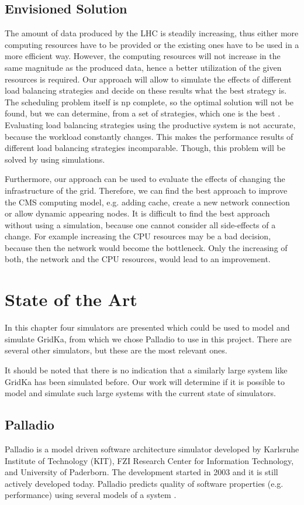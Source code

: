 \section{Envisioned Solution} 
The amount of data produced by the LHC is steadily increasing, thus either more computing resources have to be provided or the existing ones have to be used in a more efficient way.
However, the computing resources will not increase in the same magnitude as the produced data, hence a better utilization of the given resources is required. Our approach will allow to simulate the effects of different load balancing strategies and decide on these results what the best strategy is. The scheduling problem itself is np complete, so the optimal solution will not be found, but we can determine, from a set of strategies, which one is the best \cite{1698650}. Evaluating load balancing strategies using the productive system is not accurate, because the workload constantly changes. This makes the performance results of different load balancing strategies incomparable. Though, this problem will be solved by using simulations.

Furthermore, our approach can be used to evaluate the effects of changing the infrastructure of the grid. Therefore, we can find the best approach to improve the CMS computing model, e.g. adding cache, create a new network connection or allow dynamic appearing nodes.
It is difficult to find the best approach without using a simulation, because one cannot consider all side-effects of a change. For example increasing the CPU resources may be a bad decision, because then the network would become the bottleneck. Only the increasing of both, the network and the CPU resources, would lead to an improvement.


\chapter {State of the Art}
In this chapter four simulators are presented which could be used to model and simulate GridKa, from which we chose Palladio to use in this project. There are several other simulators, but these are the most relevant ones.

It should be noted that there is no indication that a similarly large system like GridKa has been simulated before. Our work will determine if it is possible to model and simulate such large systems with the current state of simulators.

\section{Palladio}
\label{palladio}
Palladio is a model driven software architecture simulator developed by Karlsruhe Institute of Technology (KIT), FZI Research Center for Information Technology, and University of Paderborn. The development started in 2003 and it is still actively developed today. Palladio predicts quality of software properties (e.g. performance) using several models of a system \cite{BECKER20093}.

